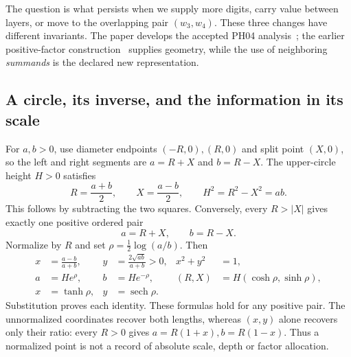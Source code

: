 \documentclass[11pt,a4paper]{article}
\newcommand{\sech}{\operatorname{sech}}
\begin{document}
The question is what persists when we supply more digits, carry value between layers, or move to the overlapping pair $(w_3,w_4)$. These three changes have different invariants. The paper develops the accepted PH04 analysis~\cite{ph04,review}; the earlier positive-factor construction~\cite{multiplication,ph03} supplies geometry, while the use of neighboring \emph{summands} is the declared new representation.

\clearpage
\subsection{A circle, its inverse, and the information in its scale}
\label{sec:circle}
For $a,b>0$, use diameter endpoints $(-R,0),(R,0)$ and split point $(X,0)$, so the left and right segments are $a=R+X$ and $b=R-X$. The upper-circle height $H>0$ satisfies
\begin{equation}
R=\frac{a+b}{2},\qquad X=\frac{a-b}{2},\qquad
H^2=R^2-X^2=ab.
\label{eq:circle}
\end{equation}
This follows by subtracting the two squares. Conversely, every $R>|X|$ gives exactly one positive ordered pair
\begin{equation}
a=R+X,\qquad b=R-X.
\label{eq:inverse}
\end{equation}
Normalize by $R$ and set $\rho=\tfrac12\log(a/b)$. Then
\begin{align}
x&=\frac{a-b}{a+b},&y&=\frac{2\sqrt{ab}}{a+b}>0,&x^2+y^2&=1,\label{eq:normalized}\\
a&=He^\rho,&b&=He^{-\rho},& (R,X)&=H(\cosh\rho,\sinh\rho),\label{eq:rapidity}\\
x&=\tanh\rho,&y&=\sech\rho.&&\label{eq:tanh}
\end{align}
Substitution proves each identity. These formulas hold for any positive pair. The unnormalized coordinates recover both lengths, whereas $(x,y)$ alone recovers only their ratio: every $R>0$ gives $a=R(1+x), b=R(1-x)$. Thus a normalized point is not a record of absolute scale, depth or factor allocation.
\end{document}

